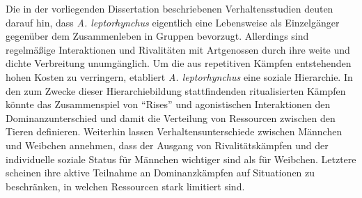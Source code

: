\documentclass[11pt,pdftex,]{book}
\newcommand{\lepto}{\textit{A. leptorhynchus}}
\begin{document}
Die in der vorliegenden Dissertation beschriebenen Verhaltensstudien deuten darauf hin, dass \lepto{} eigentlich eine Lebensweise als Einzelgänger gegenüber dem Zusammenleben in Gruppen bevorzugt. Allerdings sind regelmäßige Interaktionen und Rivalitäten mit Artgenossen durch ihre weite und dichte Verbreitung unumgänglich. Um die aus repetitiven Kämpfen entstehenden hohen Kosten zu verringern, etabliert \lepto{} eine soziale Hierarchie. In den zum Zwecke dieser Hierarchiebildung stattfindenden ritualisierten Kämpfen könnte das Zusammenspiel von ``Rises'' und agonistischen Interaktionen den Dominanzunterschied und damit die Verteilung von Ressourcen zwischen den Tieren definieren. Weiterhin lassen Verhaltensunterschiede zwischen Männchen und Weibchen annehmen, dass der Ausgang von Rivalitätskämpfen und der individuelle soziale Status für Männchen wichtiger sind als für Weibchen. Letztere scheinen ihre aktive Teilnahme an Dominanzkämpfen auf Situationen zu beschränken, in welchen Ressourcen stark limitiert sind.


\thispagestyle{plain}
\end{document}
